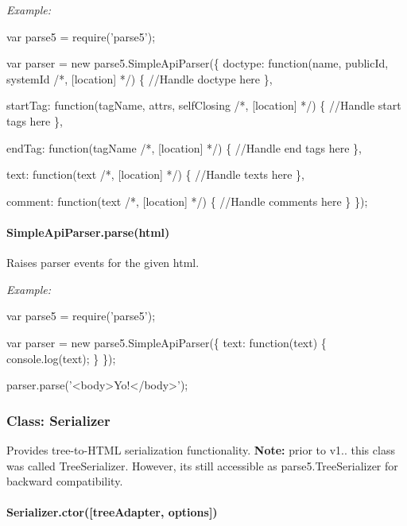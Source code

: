 {\itshape Example\+:} 
\begin{DoxyCode}
var parse5 = require('parse5');

var parser = new parse5.SimpleApiParser(\{
    doctype: function(name, publicId, systemId /*, [location] */) \{
        //Handle doctype here
    \},

    startTag: function(tagName, attrs, selfClosing /*, [location] */) \{
        //Handle start tags here
    \},

    endTag: function(tagName /*, [location] */) \{
        //Handle end tags here
    \},

    text: function(text /*, [location] */) \{
        //Handle texts here
    \},

    comment: function(text /*, [location] */) \{
        //Handle comments here
    \}
\});
\end{DoxyCode}


\paragraph*{\textbullet{} Simple\+Api\+Parser.\+parse(html)}

Raises parser events for the given {\ttfamily html}.

{\itshape Example\+:} 
\begin{DoxyCode}
var parse5 = require('parse5');

var parser = new parse5.SimpleApiParser(\{
    text: function(text) \{
        console.log(text);
    \}
\});

parser.parse('<body>Yo!</body>');
\end{DoxyCode}
 



\subsubsection*{Class\+: Serializer}

Provides tree-\/to-\/\+H\+T\+ML serialization functionality. {\bfseries Note\+:} prior to v1.. this class was called {\ttfamily Tree\+Serializer}. However, it\textquotesingle{}s still accessible as {\ttfamily parse5.\+Tree\+Serializer} for backward compatibility.

\paragraph*{\textbullet{} Serializer.\+ctor(\mbox{[}tree\+Adapter, options\mbox{]})}

